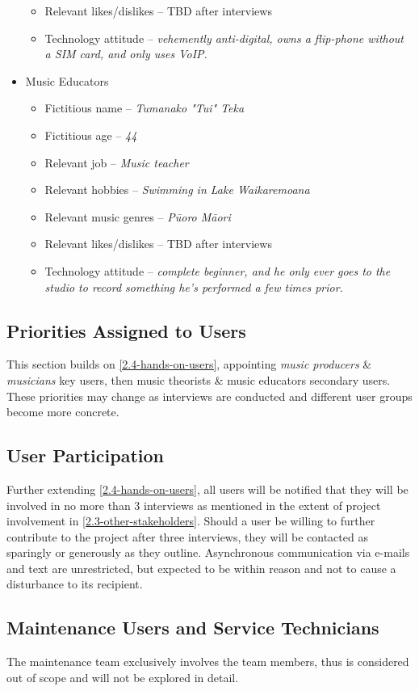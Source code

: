 \documentclass[12pt]{article}
\begin{document}
\begin{itemize}
\begin{itemize}
    \item Relevant likes/dislikes -- TBD after interviews
    \item Technology attitude --  \emph{vehemently anti-digital, owns a flip-phone without a SIM card, and only uses VoIP.}
  \end{itemize}
  \item Music Educators
  \begin{itemize}
    \item Fictitious name -- \emph{Tumanako "Tui" Teka}
    \item Fictitious age -- \emph{44}
    \item Relevant job -- \emph{Music teacher}
    \item Relevant hobbies -- \emph{Swimming in Lake Waikaremoana}
    \item Relevant music genres -- \emph{Pūoro Māori}
    \item Relevant likes/dislikes -- TBD after interviews
    \item Technology attitude --  \emph{complete beginner, and he only ever goes to the studio to record something he's performed a few times prior.}
  \end{itemize}
\end{itemize}
\subsection{Priorities Assigned to Users}
This section builds on \ref{2.4-hands-on-users}, appointing \emph{music producers} \& \emph{musicians} key users, then music theorists \& music educators secondary users. These priorities may change as interviews are conducted and different user groups become more concrete.
\subsection{User Participation}
Further extending \ref{2.4-hands-on-users}, all users will be notified that they will be involved in no more than 3 interviews as mentioned in the extent of project involvement in \ref{2.3-other-stakeholders}. Should a user be willing to further contribute to the project after three interviews, they will be contacted as sparingly or generously as they outline. Asynchronous communication via e-mails and text are unrestricted, but expected to be within reason and not to cause a disturbance to its recipient.
\subsection{Maintenance Users and Service Technicians}
The maintenance team exclusively involves the team members, thus is considered out of scope and will not be explored in detail.
\end{document}

